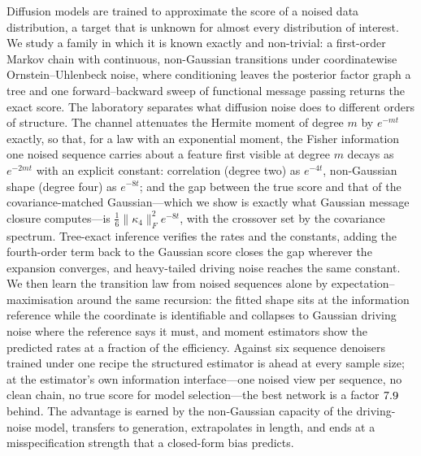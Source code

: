 Diffusion models are trained to approximate the score of a noised data distribution,
a target that is unknown for almost every distribution of interest. We study a family
in which it is known exactly and non-trivial: a first-order Markov chain with
continuous, non-Gaussian transitions under coordinatewise Ornstein--Uhlenbeck noise,
where conditioning leaves the posterior factor graph a tree and one forward--backward
sweep of functional message passing returns the exact score. The laboratory separates
what diffusion noise does to different orders of structure. The channel attenuates the
Hermite moment of degree $m$ by $e^{-mt}$ exactly, so that, for a law with an
exponential moment, the Fisher information one noised sequence carries about a
feature first visible at degree $m$ decays as $e^{-2mt}$ with an explicit constant:
correlation (degree two) as $e^{-4t}$, non-Gaussian shape (degree four) as
$e^{-8t}$; and the gap between the true score and that of the covariance-matched
Gaussian---which we show is exactly what Gaussian message closure computes---is
$\tfrac16\lVert\kappa_4\rVert_F^2e^{-8t}$, with the crossover set by the covariance
spectrum. Tree-exact inference verifies the rates and the constants, adding the
fourth-order term back to the Gaussian score closes the gap wherever the expansion
converges, and heavy-tailed driving noise reaches the same constant. We then learn the
transition law from noised sequences alone by expectation--maximisation around the same
recursion: the fitted shape sits at the information reference while the coordinate is
identifiable and collapses to Gaussian driving noise where the reference says it must,
and moment estimators show the predicted rates at a fraction of the efficiency.
Against six sequence denoisers trained under one recipe the structured estimator is
ahead at every sample size; at the estimator's own information interface---one noised
view per sequence, no clean chain, no true score for model selection---the best network
is a factor $7.9$ behind. The advantage is earned by the non-Gaussian
capacity of the driving-noise model, transfers to generation, extrapolates in length, and
ends at a misspecification strength that a closed-form bias predicts.
